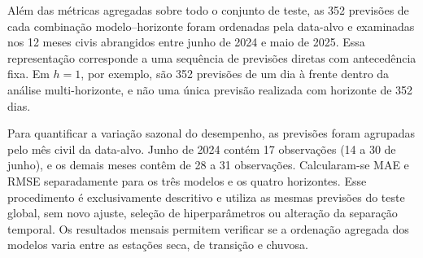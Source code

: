 Além das métricas agregadas sobre todo o conjunto de teste, as 352 previsões de cada combinação modelo--horizonte foram ordenadas pela data-alvo e examinadas nos 12 meses civis abrangidos entre junho de 2024 e maio de 2025. Essa representação corresponde a uma sequência de previsões diretas com antecedência fixa. Em $h=1$, por exemplo, são 352 previsões de um dia à frente dentro da análise multi-horizonte, e não uma única previsão realizada com horizonte de 352 dias.

Para quantificar a variação sazonal do desempenho, as previsões foram agrupadas pelo mês civil da data-alvo. Junho de 2024 contém 17 observações (14 a 30 de junho), e os demais meses contêm de 28 a 31 observações. Calcularam-se MAE e RMSE separadamente para os três modelos e os quatro horizontes. Esse procedimento é exclusivamente descritivo e utiliza as mesmas previsões do teste global, sem novo ajuste, seleção de hiperparâmetros ou alteração da separação temporal. Os resultados mensais permitem verificar se a ordenação agregada dos modelos varia entre as estações seca, de transição e chuvosa.


